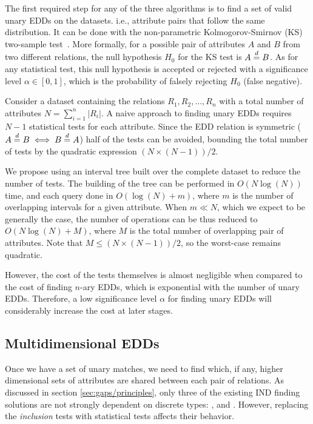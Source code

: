 The first required step for any of the three algorithms is to find a set of valid unary
\glspl{EDD} on the datasets. i.e., attribute pairs that follow
the same distribution. It can be done with the non-parametric
Kolmogorov-Smirnov (KS) two-sample test~\cite{Hodges1958}.
More formally, for a possible pair of attributes $A$ and $B$ from two different relations,
the null hypothesis $H_0$ for the KS test is $A \stackrel{d}{=} B$. As for any statistical test,
this null hypothesis is accepted or rejected with a significance level $\alpha \in [0,1]$,
which is the probability of falsely rejecting $H_0$ (false negative).

Consider a dataset containing the relations $R_1,R_2,\ldots,R_n$ with a total number of
attributes $N = \sum_{i=1}^n |R_i|$. A naive approach to finding unary \glspl{EDD} requires $N - 1$
statistical tests for each attribute. Since the \gls{EDD} relation is symmetric
($A \stackrel{d}{=} B \iff B \stackrel{d}{=} A$) half of the tests can be avoided, bounding the total number
of tests by the quadratic expression $(N \times (N - 1)) / 2$.

We propose using an interval tree built over the complete dataset to reduce the number of tests.
The building of the tree can be performed in $O(N \log(N))$ time, and each query done in
$O(\log(N) + m)$, where $m$ is the number of overlapping intervals for a given attribute.
When $m \ll N$, which we expect to be generally the case, the number of operations can be thus
reduced to $O(N \log(N) + M)$, where $M$ is the total number of overlapping pair of attributes.
Note that $M \le (N \times (N - 1)) / 2$, so the worst-case remains quadratic.

However, the cost of the tests themselves is almost negligible when compared to the cost of
finding $n$-ary \glspl{EDD}, which is exponential with
the number of unary \glspl{EDD}. Therefore, a low significance level $\alpha$ for finding unary \glspl{EDD}
will considerably increase the cost at later stages.

\subsection{Multidimensional EDDs}
\label{sec:multidimensional_edd}
Once we have a set of unary matches, we need to find which, if any, higher dimensional
sets of attributes are shared between each pair of relations. As discussed in section
\ref{sec:gaps/principles}, only three of the existing \gls{IND} finding solutions are not strongly
dependent on discrete types: \Mind, \Zigzag and \Find.
However, replacing the \emph{inclusion} tests with statistical tests affects their behavior.

